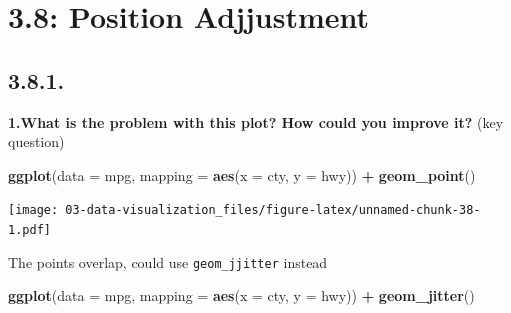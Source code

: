 \documentclass[]{book}
\newenvironment{Shaded}{\begin{snugshade}}{\end{snugshade}}
\newcommand{\DataTypeTok}[1]{\textcolor[rgb]{0.13,0.29,0.53}{#1}}
\newcommand{\KeywordTok}[1]{\textcolor[rgb]{0.13,0.29,0.53}{\textbf{#1}}}
\newcommand{\NormalTok}[1]{#1}
\newcommand{\OperatorTok}[1]{\textcolor[rgb]{0.81,0.36,0.00}{\textbf{#1}}}
\newcommand{\StringTok}[1]{\textcolor[rgb]{0.31,0.60,0.02}{#1}}
\theoremstyle{definition}
\theoremstyle{definition}
\theoremstyle{definition}
\theoremstyle{remark}
\begin{document}
\begin{Shaded}
\end{Shaded}

\hypertarget{position-adjjustment}{%
\section{3.8: Position Adjjustment}\label{position-adjjustment}}

\hypertarget{section-5}{%
\subsection{3.8.1.}\label{section-5}}

\textbf{1.What is the problem with this plot? How could you improve it?}
(key question)

\begin{Shaded}
\begin{Highlighting}[]
\KeywordTok{ggplot}\NormalTok{(}\DataTypeTok{data =}\NormalTok{ mpg, }\DataTypeTok{mapping =} \KeywordTok{aes}\NormalTok{(}\DataTypeTok{x =}\NormalTok{ cty, }\DataTypeTok{y =}\NormalTok{ hwy)) }\OperatorTok{+}\StringTok{ }
\StringTok{  }\KeywordTok{geom_point}\NormalTok{()}
\end{Highlighting}
\end{Shaded}

\texttt{[image: 03-data-visualization\_files/figure-latex/unnamed-chunk-38-1.pdf]}

The points overlap, could use \texttt{geom\_jjitter} instead

\begin{Shaded}
\begin{Highlighting}[]
\KeywordTok{ggplot}\NormalTok{(}\DataTypeTok{data =}\NormalTok{ mpg, }\DataTypeTok{mapping =} \KeywordTok{aes}\NormalTok{(}\DataTypeTok{x =}\NormalTok{ cty, }\DataTypeTok{y =}\NormalTok{ hwy)) }\OperatorTok{+}\StringTok{ }
\StringTok{  }\KeywordTok{geom_jitter}\NormalTok{()}
\end{Highlighting}
\end{Shaded}
\end{document}
